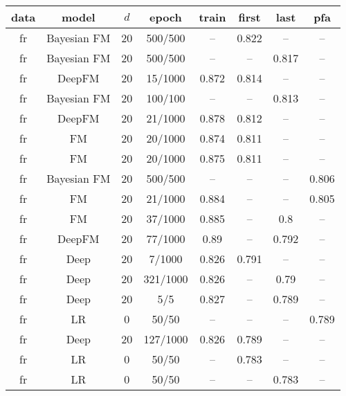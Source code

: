 \begin{tabular}{cccccccc}
\toprule
data &        model &  $d$ &     epoch &  train &  first &   last &    pfa \\
\midrule
  fr &  Bayesian FM &   20 &   500/500 &     -- &  0.822 &     -- &     -- \\
  fr &  Bayesian FM &   20 &   500/500 &     -- &     -- &  0.817 &     -- \\
  fr &       DeepFM &   20 &   15/1000 &  0.872 &  0.814 &     -- &     -- \\
  fr &  Bayesian FM &   20 &   100/100 &     -- &     -- &  0.813 &     -- \\
  fr &       DeepFM &   20 &   21/1000 &  0.878 &  0.812 &     -- &     -- \\
  fr &           FM &   20 &   20/1000 &  0.874 &  0.811 &     -- &     -- \\
  fr &           FM &   20 &   20/1000 &  0.875 &  0.811 &     -- &     -- \\
  fr &  Bayesian FM &   20 &   500/500 &     -- &     -- &     -- &  0.806 \\
  fr &           FM &   20 &   21/1000 &  0.884 &     -- &     -- &  0.805 \\
  fr &           FM &   20 &   37/1000 &  0.885 &     -- &    0.8 &     -- \\
  fr &       DeepFM &   20 &   77/1000 &   0.89 &     -- &  0.792 &     -- \\
  fr &         Deep &   20 &    7/1000 &  0.826 &  0.791 &     -- &     -- \\
  fr &         Deep &   20 &  321/1000 &  0.826 &     -- &   0.79 &     -- \\
  fr &         Deep &   20 &       5/5 &  0.827 &     -- &  0.789 &     -- \\
  fr &           LR &    0 &     50/50 &     -- &     -- &     -- &  0.789 \\
  fr &         Deep &   20 &  127/1000 &  0.826 &  0.789 &     -- &     -- \\
  fr &           LR &    0 &     50/50 &     -- &  0.783 &     -- &     -- \\
  fr &           LR &    0 &     50/50 &     -- &     -- &  0.783 &     -- \\
\bottomrule
\end{tabular}
